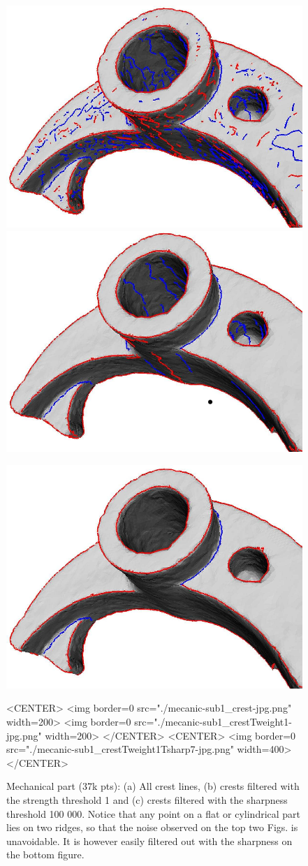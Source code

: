 \begin{figure}[htb] 
\begin{ccTexOnly}
\centerline{ 
\includegraphics[width=.45\linewidth]{Ridges_3/mecanic-sub1_crest-jpg}
\includegraphics[width=.45\linewidth]{Ridges_3/mecanic-sub1_crestTweight1-jpg}}
\centerline{
\includegraphics[width=.6\linewidth]{Ridges_3/mecanic-sub1_crestTweight1Tsharp7-jpg}}
\end{ccTexOnly}
\caption{Mechanical part (37k pts): (a) All crest lines, (b) crests filtered
with the strength threshold 1 and (c) crests filtered with the sharpness threshold 100 000.
Notice that any point on a flat or cylindrical part lies on two
ridges, so that the noise observed on the top two Figs. is
unavoidable. It is however easily filtered out with the sharpness on
the bottom figure.}
\label{fig:mechanical_crest_filtered-intro} 
\begin{ccHtmlOnly}
<CENTER> <img border=0 src="./mecanic-sub1_crest-jpg.png" width=200>
 <img border=0 src="./mecanic-sub1_crestTweight1-jpg.png" width=200>
</CENTER>
<CENTER>
 <img border=0 src="./mecanic-sub1_crestTweight1Tsharp7-jpg.png" width=400>
</CENTER>
\end{ccHtmlOnly}
\end{figure} 
